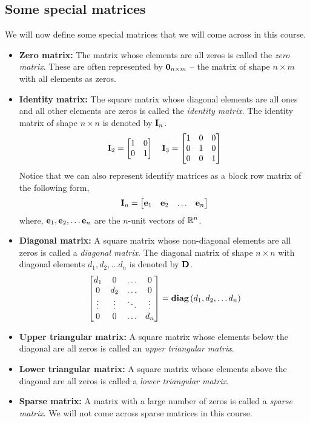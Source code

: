 \subsection{Some special matrices}
We will now define some special matrices that we will come across in this course.
\begin{itemize}
    \item \textbf{Zero matrix:} The matrix whose elements are all zeros is called the \textit{zero matrix}. These are often represented by $\mathbf{0}_{n \times m}$ --  the matrix of shape $n \times m$ with all elements as zeros.
    \item \textbf{Identity matrix:} The square matrix whose diagonal elements are all ones and all other elements are zeros is called the \textit{identity matrix}. The identity matrix of shape $n \times n$ is denoted by $\mathbf{I}_n$.
    \[ \mf{I}_2 = \bmxc 1 & 0 \\ 0 & 1 \emx \quad \mf{I}_3 = \bmxc 1 & 0 & 0 \\ 0 & 1 & 0 \\ 0 & 0 & 1 \emx \]
    Notice that we can also represent identify matrices as a block row matrix of the following form,
    \[ \mf{I}_n = \bmxc \mf{e}_1 & \mf{e}_2 & \ldots & \mf{e}_n \emx \]
    where, $\mathbf{e}_1, \mathbf{e}_2, \ldots \mathbf{e}_n$ are the $n$-unit vectors of $\mathbb{R}^n$.
    \item \textbf{Diagonal matrix:} A square matrix whose non-diagonal elements are all zeros is called a \textit{diagonal matrix}. The diagonal matrix of shape $n \times n$ with diagonal elements $d_1, d_2, \ldots d_n$ is denoted by $\mathbf{D}$.
    \[ \bmxc d_1 & 0 & \ldots & 0 \\ 0 & d_2 & \ldots & 0 \\ \vdots & \vdots & \ddots & \vdots \\ 0 & 0 & \ldots & d_n \emx = \textbf{diag}\pp{d_1, d_2, \dots d_n}\]
    \item \textbf{Upper triangular matrix:} A square matrix whose elements below the diagonal are all zeros is called an \textit{upper triangular matrix}.
    \item \textbf{Lower triangular matrix:} A square matrix whose elements above the diagonal are all zeros is called a \textit{lower triangular matrix}.
    \item \textbf{Sparse matrix:} A matrix with a large number of zeros is called a \textit{sparse matrix}. We will not come across sparse matrices in this course.
\end{itemize}

